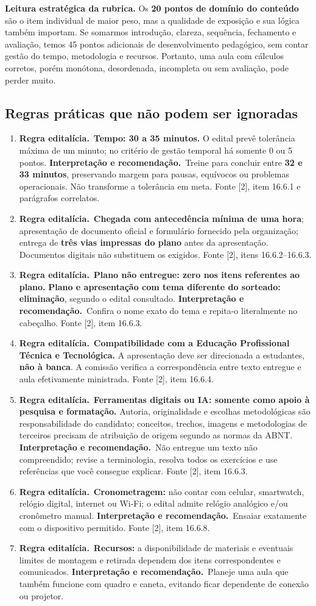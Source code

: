 \documentclass[11pt,a4paper]{article}
\newcommand{\regra}{\textbf{Regra editalícia.}~}
\newcommand{\analise}{\textbf{Interpretação e recomendação.}~}
\begin{document}
\textbf{Leitura estratégica da rubrica.} Os \textbf{20 pontos de domínio do conteúdo} são o item individual de maior peso, mas a qualidade de exposição e sua lógica também importam. Se somarmos introdução, clareza, sequência, fechamento e avaliação, temos 45 pontos adicionais de desenvolvimento pedagógico, sem contar gestão do tempo, metodologia e recursos. Portanto, uma aula com cálculos corretos, porém monótona, desordenada, incompleta ou sem avaliação, pode perder muito.

\subsection{Regras práticas que não podem ser ignoradas}
\begin{enumerate}
\item \regra\textbf{Tempo: 30 a 35 minutos.} O edital prevê tolerância máxima de um minuto; no critério de gestão temporal há somente 0 ou 5 pontos. \analise Treine para concluir entre \textbf{32 e 33 minutos}, preservando margem para pausas, equívocos ou problemas operacionais. Não transforme a tolerância em meta. Fonte [2], item 16.6.1 e parágrafos correlatos.
\item \regra\textbf{Chegada com antecedência mínima de uma hora}; apresentação de documento oficial e formulário fornecido pela organização; entrega de \textbf{três vias impressas do plano} antes da apresentação. Documentos digitais não substituem os exigidos. Fonte [2], itens 16.6.2--16.6.3.
\item \regra\textbf{Plano não entregue: zero nos itens referentes ao plano.} \textbf{Plano e apresentação com tema diferente do sorteado: eliminação}, segundo o edital consultado. \analise Confira o nome exato do tema e repita-o literalmente no cabeçalho. Fonte [2], item 16.6.3.
\item \regra\textbf{Compatibilidade com a Educação Profissional Técnica e Tecnológica.} A apresentação deve ser direcionada a estudantes, \textbf{não à banca}. A comissão verifica a correspondência entre texto entregue e aula efetivamente ministrada. Fonte [2], item 16.6.4.
\item \regra\textbf{Ferramentas digitais ou IA: somente como apoio à pesquisa e formatação.} Autoria, originalidade e escolhas metodológicas são responsabilidade do candidato; conceitos, trechos, imagens e metodologias de terceiros precisam de atribuição de origem segundo as normas da ABNT. \analise Não entregue um texto não compreendido; revise a terminologia, resolva todos os exercícios e use referências que você consegue explicar. Fonte [2], item 16.6.3.
\item \regra\textbf{Cronometragem:} não contar com celular, smartwatch, relógio digital, internet ou Wi-Fi; o edital admite relógio analógico e/ou cronômetro manual. \analise Ensaiar exatamente com o dispositivo permitido. Fonte [2], item 16.6.8.
\item \regra\textbf{Recursos:} a disponibilidade de materiais e eventuais limites de montagem e retirada dependem dos itens correspondentes e comunicados. \analise Planeje uma aula que também funcione com quadro e caneta, evitando ficar dependente de conexão ou projetor.
\end{enumerate}
\end{document}
